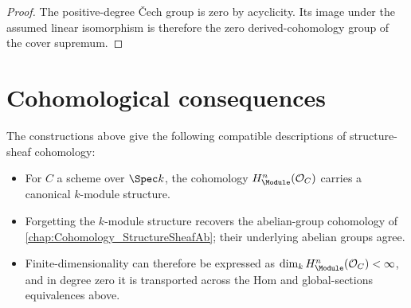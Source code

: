 \begin{proof}
  \leanok
  The positive-degree \v{C}ech group is zero by acyclicity. Its image under the assumed linear isomorphism is therefore the zero derived-cohomology group of the cover supremum.
\end{proof}

\section{Cohomological consequences}

The constructions above give the following compatible descriptions of structure-sheaf cohomology:

\begin{itemize}
  \item For \(C\) a scheme over \(\Spec k\), the cohomology \(H^n_{\Module}(\mathcal O_C)\) carries a canonical \(k\)-module structure.
  \item Forgetting the \(k\)-module structure recovers the abelian-group cohomology of \cref{chap:Cohomology_StructureSheafAb}; their underlying abelian groups agree.
  \item Finite-dimensionality can therefore be expressed as \(\dim_k H^n_{\Module}(\mathcal O_C)<\infty\), and in degree zero it is transported across the Hom and global-sections equivalences above.
\end{itemize}
